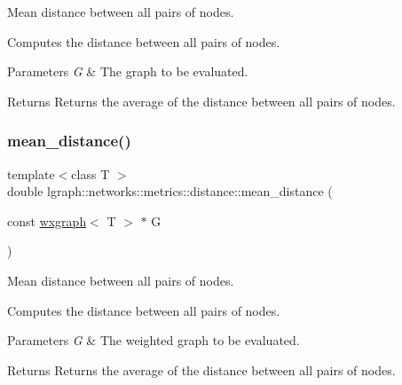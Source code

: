 Mean distance between all pairs of nodes. 

Computes the distance between all pairs of nodes.


\begin{DoxyParams}{Parameters}
{\em G} & The graph to be evaluated. \\
\hline
\end{DoxyParams}
\begin{DoxyReturn}{Returns}
Returns the average of the distance between all pairs of nodes. 
\end{DoxyReturn}
\mbox{\label{namespacelgraph_1_1networks_1_1metrics_1_1distance_a17eab7f8ea3692a6f531219ebd567a2f}} 
\subsubsection{\texorpdfstring{mean\+\_\+distance()}{mean\_distance()}\hspace{0.1cm}{\footnotesize\ttfamily [2/4]}}
{\footnotesize\ttfamily template$<$class T $>$ \\
double lgraph\+::networks\+::metrics\+::distance\+::mean\+\_\+distance (\begin{DoxyParamCaption}\item[{const \hyperlink{classlgraph_1_1wxgraph}{wxgraph}$<$ T $>$ $\ast$}]{G }\end{DoxyParamCaption})}



Mean distance between all pairs of nodes. 

Computes the distance between all pairs of nodes.


\begin{DoxyParams}{Parameters}
{\em G} & The weighted graph to be evaluated. \\
\hline
\end{DoxyParams}
\begin{DoxyReturn}{Returns}
Returns the average of the distance between all pairs of nodes. 
\end{DoxyReturn}
\mbox{\label{namespacelgraph_1_1networks_1_1metrics_1_1distance_a501153c967f84ced065825927d2d5243}} 
